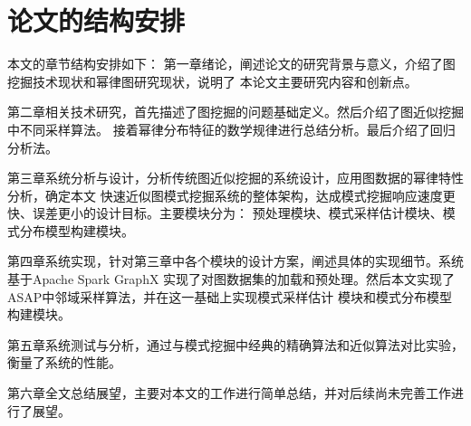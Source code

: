 \documentclass[master]{thesis-uestc}
\begin{document}
\section{论文的结构安排}
    本文的章节结构安排如下：
    第一章绪论，阐述论文的研究背景与意义，介绍了图挖掘技术现状和幂律图研究现状，说明了
本论文主要研究内容和创新点。

    第二章相关技术研究，首先描述了图挖掘的问题基础定义。然后介绍了图近似挖掘中不同采样算法。
接着幂律分布特征的数学规律进行总结分析。最后介绍了回归分析法。

    第三章系统分析与设计，分析传统图近似挖掘的系统设计，应用图数据的幂律特性分析，确定本文
快速近似图模式挖掘系统的整体架构，达成模式挖掘响应速度更快、误差更小的设计目标。主要模块分为：
预处理模块、模式采样估计模块、模式分布模型构建模块。

    第四章系统实现，针对第三章中各个模块的设计方案，阐述具体的实现细节。系统基于Apache Spark GraphX
实现了对图数据集的加载和预处理。然后本文实现了ASAP中邻域采样算法，并在这一基础上实现模式采样估计
模块和模式分布模型构建模块。

    第五章系统测试与分析，通过与模式挖掘中经典的精确算法和近似算法对比实验，衡量了系统的性能。

    第六章全文总结展望，主要对本文的工作进行简单总结，并对后续尚未完善工作进行了展望。

\end{document}
